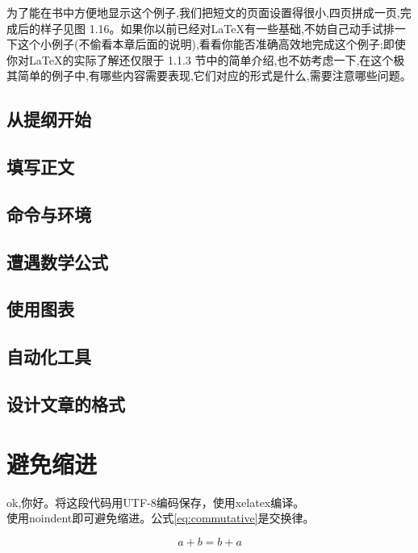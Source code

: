 为了能在书中方便地显示这个例子,我们把短文的页面设置得很小,四页拼成一页,完成后的样子见图 1.16。如果你以前已经对\LaTeX 有一些基础,不妨自己动手试排一下这个小例子(不偷看本章后面的说明),看看你能否准确高效地完成这个例子;即使你对\LaTeX 的实际了解还仅限于 1.1.3 节中的简单介绍,也不妨考虑一下,在这个极其简单的例子中,有哪些内容需要表现,它们对应的形式是什么,需要注意哪些问题。
\subsection{从提纲开始}
\subsection{填写正文}
\subsection{命令与环境}
\subsection{遭遇数学公式}
\subsection{使用图表}
\subsection{自动化工具}
\subsection{设计文章的格式}
\section{避免缩进}
ok,你好。将这段代码用UTF-8编码保存，使用xelatex编译。
\\使用noindent即可避免缩进。公式\ref{eq:commutative}是交换律。

\begin{equation}
a+b=b+a \label{eq:commutative}
\end{equation}



